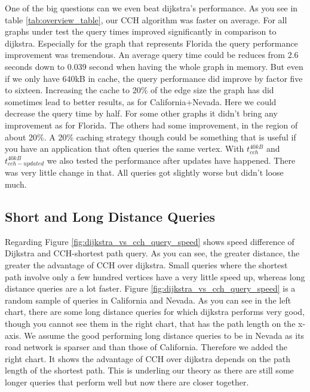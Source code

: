 One of the big questions can we even beat dijkstra's performance. As you see in table \ref{tab:overview_table}, our 
CCH algorithm was faster on average. For all graphs under test the query times improved significantly in comparison to dijkstra. Especially for the graph that represents Florida the query performance improvement 
was tremendous. An average query time could be reduces from 2.6 seconds down to 0.039 second when having the whole graph in memory. But even if we only have 640kB in cache, the query performance did improve by factor five to sixteen. 
Increasing the cache to 20\% of the edge size the graph has did sometimes lead to better results, as for California+Nevada. Here we could decrease the query time by half. For some other graphs it didn't bring any improvement as for Florida.
The others had some improvement, in the region of about 20\%. A 20\% caching strategy though could be something that is useful if you have an application that often queries the same vertex.
With $t^{40kB}_{cch}$ and $t^{40kB}_{cch-updated}$ we also tested the performance after updates have happened. There was very little change in that. All queries got slightly worse but didn't loose much.

\subsection{Short and Long Distance Queries}

Regarding Figure \ref{fig:dijkstra_vs_cch_query_speed} shows speed difference of Dijkstra and CCH-shortest path query. As you can see, the greater distance, the greater the advantage of CCH over dijkstra. Small queries where the shortest path involve only a few hundred vertices have a very little speed up,
whereas long distance queries are a lot faster. Figure \ref{fig:dijkstra_vs_cch_query_speed} is a random sample of queries in California and Nevada. As you can
see in the left chart, there are some long distance queries for which dijkstra performs very good, though you cannot see them in the right chart, that has the path 
length on the x-axis. We assume the good performing long distance queries to be in Nevada as its road network is sparser and than those of California. Therefore we added the right chart.
It shows the advantage of CCH over dijkstra depends on the path length of the shortest path. This is underling our theory as there are still some longer queries that perform well but now there are closer together.



